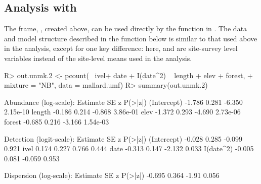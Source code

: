 \documentclass[codesnippet]{jss}
\begin{document}
\subsection[Analysis with unmarked]{Analysis with }
The  frame, , created above, can be used directly by the  function in . The data and model structure described in the  function below is similar to that used above in the  analysis, except for one key difference: here,  and  are site-survey level variables instead of the site-level means used in the  analysis.

\begin{CodeInput}
R> out.unmk.2 <- pcount(~ ivel+ date + I(date^2) ~ length + elev + forest,
+    mixture = "NB", data = mallard.umf)
R> summary(out.unmk.2)
\end{CodeInput}
\begin{CodeOutput}
Abundance (log-scale):
             Estimate         SE           z     P(>|z|)
(Intercept)    -1.786      0.281      -6.350    2.15e-10
length         -0.186      0.214      -0.868    3.86e-01
elev           -1.372      0.293      -4.690    2.73e-06
forest         -0.685      0.216      -3.166    1.54e-03

Detection (logit-scale):
             Estimate         SE           z     P(>|z|)
(Intercept)    -0.028      0.285      -0.099       0.921
ivel            0.174      0.227       0.766       0.444
date           -0.313      0.147      -2.132       0.033
I(date^2)      -0.005      0.081      -0.059       0.953

Dispersion (log-scale):
Estimate          SE       z    P(>|z|)
-0.695         0.364   -1.91      0.056
\end{CodeOutput}
\end{document}
